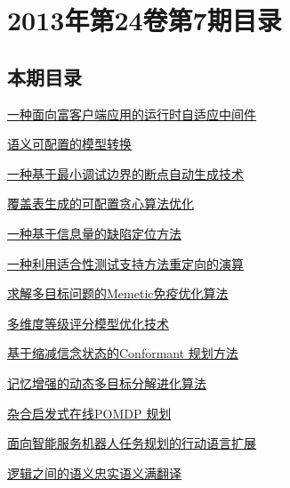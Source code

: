 \documentclass[a4paper]{article}
\begin{document}
\section{\textbf{2013年第24卷第7期目录}}
\subsection{本期目录}
\href{http://www.jos.org.cn/ch/reader/download_pdf.aspx?file_no=4319&year_id=2013&quarter_id=7&falg=1}{一种面向富客户端应用的运行时自适应中间件}

\href{http://www.jos.org.cn/ch/reader/download_pdf.aspx?file_no=4333&year_id=2013&quarter_id=7&falg=1}{语义可配置的模型转换}

\href{http://www.jos.org.cn/ch/reader/download_pdf.aspx?file_no=4310&year_id=2013&quarter_id=7&falg=1}{一种基于最小调试边界的断点自动生成技术}

\href{http://www.jos.org.cn/ch/reader/download_pdf.aspx?file_no=4326&year_id=2013&quarter_id=7&falg=1}{覆盖表生成的可配置贪心算法优化}

\href{http://www.jos.org.cn/ch/reader/download_pdf.aspx?file_no=4294&year_id=2013&quarter_id=7&falg=1}{一种基于信息量的缺陷定位方法}

\href{http://www.jos.org.cn/ch/reader/download_pdf.aspx?file_no=4269&year_id=2013&quarter_id=7&falg=1}{一种利用适合性测试支持方法重定向的演算}

\href{http://www.jos.org.cn/ch/reader/download_pdf.aspx?file_no=4282&year_id=2013&quarter_id=7&falg=1}{求解多目标问题的Memetic免疫优化算法}

\href{http://www.jos.org.cn/ch/reader/download_pdf.aspx?file_no=4278&year_id=2013&quarter_id=7&falg=1}{多维度等级评分模型优化技术}

\href{http://www.jos.org.cn/ch/reader/download_pdf.aspx?file_no=4289&year_id=2013&quarter_id=7&falg=1}{基于缩减信念状态的Conformant 规划方法}

\href{http://www.jos.org.cn/ch/reader/download_pdf.aspx?file_no=4311&year_id=2013&quarter_id=7&falg=1}{记忆增强的动态多目标分解进化算法}

\href{http://www.jos.org.cn/ch/reader/download_pdf.aspx?file_no=4318&year_id=2013&quarter_id=7&falg=1}{杂合启发式在线POMDP 规划}

\href{http://www.jos.org.cn/ch/reader/download_pdf.aspx?file_no=4331&year_id=2013&quarter_id=7&falg=1}{面向智能服务机器人任务规划的行动语言扩展}

\href{http://www.jos.org.cn/ch/reader/download_pdf.aspx?file_no=4285&year_id=2013&quarter_id=7&falg=1}{逻辑之间的语义忠实语义满翻译}
\end{document}
